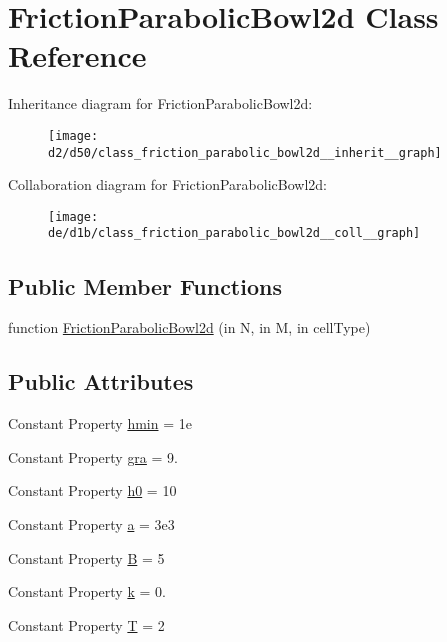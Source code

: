 \hypertarget{class_friction_parabolic_bowl2d}{}\section{Friction\+Parabolic\+Bowl2d Class Reference}
\label{class_friction_parabolic_bowl2d}


Inheritance diagram for Friction\+Parabolic\+Bowl2d\+:
\nopagebreak
\begin{figure}[H]
\begin{center}
\leavevmode
\texttt{[image: d2/d50/class\_friction\_parabolic\_bowl2d\_\_inherit\_\_graph]}
\end{center}
\end{figure}


Collaboration diagram for Friction\+Parabolic\+Bowl2d\+:
\nopagebreak
\begin{figure}[H]
\begin{center}
\leavevmode
\texttt{[image: de/d1b/class\_friction\_parabolic\_bowl2d\_\_coll\_\_graph]}
\end{center}
\end{figure}
\subsection*{Public Member Functions}
\begin{DoxyCompactItemize}
\item 
function \hyperlink{class_friction_parabolic_bowl2d_a1db2f220c5b9d2c6ea85625c1797d15b}{Friction\+Parabolic\+Bowl2d} (in N, in M, in cell\+Type)
\end{DoxyCompactItemize}
\subsection*{Public Attributes}
\begin{DoxyCompactItemize}
\item 
Constant Property \hyperlink{class_friction_parabolic_bowl2d_a1b1d1e85001c0f15ead93a6ff53fe31d}{hmin} = 1e
\item 
Constant Property \hyperlink{class_friction_parabolic_bowl2d_a1d50fa1138cc63ec66f79aa443848770}{gra} = 9.
\item 
Constant Property \hyperlink{class_friction_parabolic_bowl2d_a6bc0c071fef1323b966bce9a61f8605d}{h0} = 10
\item 
Constant Property \hyperlink{class_friction_parabolic_bowl2d_a13e833f8645192e73bb61e7448c3c75c}{a} = 3e3
\item 
Constant Property \hyperlink{class_friction_parabolic_bowl2d_a8a9476eef1931827d87cba32ca9d8408}{B} = 5
\item 
Constant Property \hyperlink{class_friction_parabolic_bowl2d_aec6d143d813d3467a6fc99e2385f9fc4}{k} = 0.
\item 
Constant Property \hyperlink{class_friction_parabolic_bowl2d_a40d060ed198c1f0a0ac781e87cfab8d3}{T} = 2
\end{DoxyCompactItemize}
